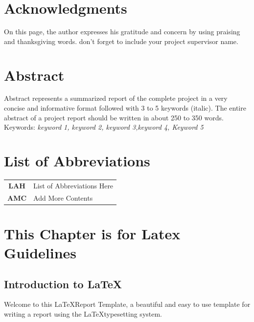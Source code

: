 \documentclass[12pt,a4paper]{report}
\begin{document}
\chapter*{Acknowledgments}
On this page, the author expresses his gratitude and concern by using praising and thanksgiving words.  don’t forget to include your project supervisor name.
\chapter*{Abstract}
Abstract represents a summarized report of the complete project in a very concise and informative format followed with 3 to 5 keywords (italic). The entire abstract of a project report should be written in about 250 to 350 words.\\
\newline
Keywords: \textit{keyword 1, keyword 2, keyword 3,keyword 4, Keyword 5}
\tableofcontents
{}
\listoffigures
{}
\listoftables
{}
\chapter*{List of Abbreviations}
\begin{tabular}{c l}
\textbf{LAH}     &  List of Abbreviations Here\\
\textbf{AMC}     &  Add More Contents
\end{tabular}
\chapter{This Chapter is for Latex Guidelines}
\section{Introduction to \LaTeX}
Welcome to this \LaTeX Report Template, a beautiful and easy to use template for writing a report using the \LaTeX typesetting system.
\end{document}
